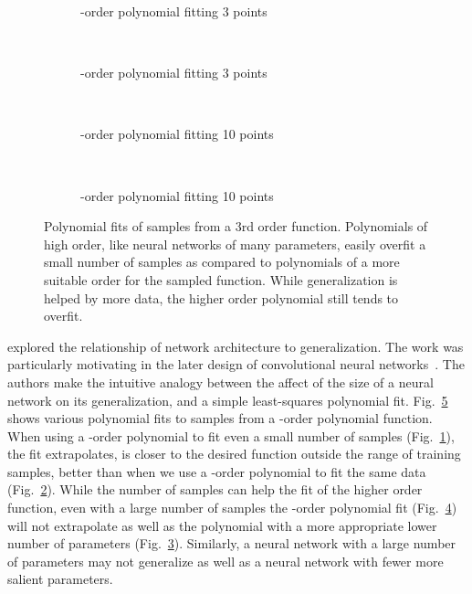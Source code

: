 \documentclass[thesis]{subfiles}
\begin{document}
	\begin{figure}[tb]
		\centering
		\begin{subfigure}[t]{0.49\textwidth}
			\resizebox{\linewidth}{!}{}
			\caption{-order polynomial fitting 3 points}
			\label{fig:polyfit3rd}
		\end{subfigure}
		~
		\begin{subfigure}[t]{0.49\textwidth}
			\resizebox{\linewidth}{!}{}
			\caption{-order polynomial fitting 3 points}
			\label{fig:polyfit20th}
		\end{subfigure}\\	
		\begin{subfigure}[t]{0.49\textwidth}
			\resizebox{\linewidth}{!}{}
			\caption{-order polynomial fitting 10 points}
			\label{fig:polyfit3rdlots}
		\end{subfigure}
		~
		\begin{subfigure}[t]{0.49\textwidth}
			\resizebox{\linewidth}{!}{}
			\caption{-order polynomial fitting 10 points}
			\label{fig:polyfit20thlots}
		\end{subfigure}
		\caption[Polynomial Data Fitting]{Polynomial fits of samples from a 3rd order function. Polynomials of high order, like neural networks of many parameters, easily overfit a small number of samples as compared to polynomials of a more suitable order for the sampled function. While generalization is helped by more data, the higher order polynomial still tends to overfit.}
		\label{fig:polyfits}
	\end{figure}

	\citet{denker1987large} explored the relationship of network architecture to generalization. The work was particularly motivating in the later design of convolutional neural networks~\citep{lecun1989generalization, lecun1989backpropagation}. The authors make the intuitive analogy between the affect of the size of a neural network on its generalization, and a simple least-squares polynomial fit. Fig.~\ref{fig:polyfits} shows various polynomial fits to samples from a -order polynomial function. When using a -order polynomial to fit even a small number of samples (Fig.~\ref{fig:polyfit3rd}), the fit extrapolates, \ie is closer to the desired function outside the range of training samples, better than when we use a -order polynomial to fit the same data (Fig.~\ref{fig:polyfit20th}). While the number of samples can help the fit of the higher order function, even with a large number of samples the -order polynomial fit  (Fig.~\ref{fig:polyfit20thlots}) will not extrapolate as well as the polynomial with a more appropriate lower number of parameters (Fig.~\ref{fig:polyfit3rdlots}). Similarly, a neural network with a large number of parameters may not generalize as well as a neural network with fewer more salient parameters.
    
\end{document}

